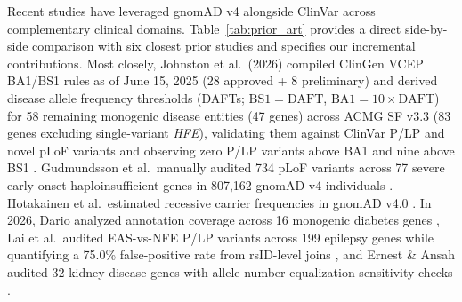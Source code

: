 \documentclass[11pt,letterpaper]{article}
\begin{document}
Recent studies have leveraged gnomAD v4 alongside ClinVar across complementary clinical domains. Table~\ref{tab:prior_art} provides a direct side-by-side comparison with six closest prior studies and specifies our incremental contributions. Most closely, Johnston et al.\ (2026) compiled ClinGen VCEP BA1/BS1 rules as of June 15, 2025 (28 approved + 8 preliminary) and derived disease allele frequency thresholds (DAFTs; $\mathrm{BS1}=\mathrm{DAFT}$, $\mathrm{BA1}=10\times\mathrm{DAFT}$) for 58 remaining monogenic disease entities (47 genes) across ACMG SF v3.3 (83 genes excluding single-variant \textit{HFE}), validating them against ClinVar P/LP and novel pLoF variants and observing zero P/LP variants above BA1 and nine above BS1 \citep{johnston2026daft}. Gudmundsson et al.\ manually audited 734 pLoF variants across 77 severe early-onset haploinsufficient genes in 807,162 gnomAD v4 individuals \citep{gudmundsson2025penetrance}. Hotakainen et al.\ estimated recessive carrier frequencies in gnomAD v4.0 \citep{hotakainen2025carrier}. In 2026, Dario analyzed annotation coverage across 16 monogenic diabetes genes \citep{dario2026mody}, Lai et al.\ audited EAS-vs-NFE P/LP variants across 199 epilepsy genes while quantifying a 75.0\% false-positive rate from rsID-level joins \citep{lai2026epilepsy}, and Ernest \& Ansah audited 32 kidney-disease genes with allele-number equalization sensitivity checks \citep{ernest2026kidney}.
\end{document}
